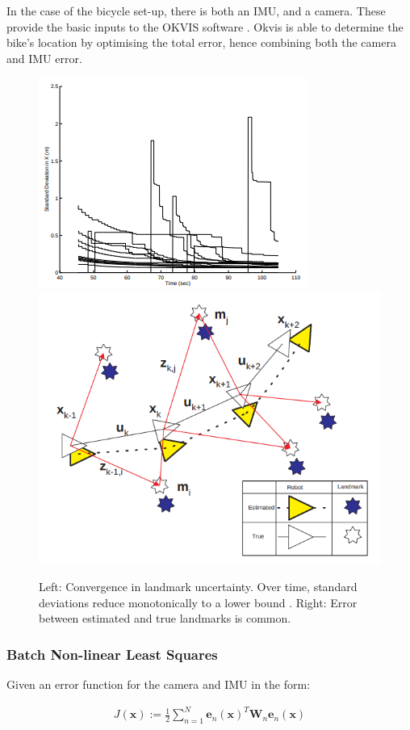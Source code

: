 \documentclass[11pt,twoside]{report}
\begin{document}
In the case of the bicycle set-up, there is both an IMU, and a camera. These provide the basic inputs to the OKVIS software \cite{Okvis_1}. Okvis is able to determine the bike's location by optimising the total error, hence combining both the camera and IMU error.

\noindent \begin{figure}[h!]
	\includegraphics[width = 0.5\hsize]{figures/convergence_landmark_uncertainty.png}
	\includegraphics[width = 0.5\hsize]{figures/ess_slam.png}
	\caption{Left: Convergence in landmark uncertainty.  Over time, standard deviations reduce monotonically to a lower bound \cite{F_Durr_Pt1}. Right: Error between estimated and true landmarks is common.}
	\label{slam_prob_fig}
\end{figure}


\subsubsection{Batch Non-linear Least Squares}

Given an error function for the camera and IMU in the form:

\begin{equation}
\begin{aligned}
J(\mathbf{x}) := \frac{1}{2} \sum_{n=1}^{N} \textbf{e}_{n} (\textbf{x})^{T} \textbf{W}_{n} \textbf{e}_{n}(\textbf{x}) 
\end{aligned}
\end{equation} 
\end{document}
